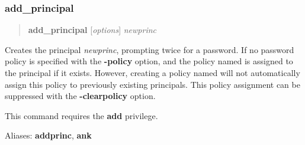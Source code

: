 \documentclass[letterpaper,10pt,english]{sphinxmanual}
\begin{document}
\subsubsection{add\_principal}
\label{admin/admin_commands/kadmin_local:add-principal}\label{admin/admin_commands/kadmin_local:id1}\begin{quote}

\textbf{add\_principal} {[}\emph{options}{]} \emph{newprinc}
\end{quote}

Creates the principal \emph{newprinc}, prompting twice for a password.  If
no password policy is specified with the \textbf{-policy} option, and the
policy named  is assigned to the principal if it exists.
However, creating a policy named  will not automatically
assign this policy to previously existing principals.  This policy
assignment can be suppressed with the \textbf{-clearpolicy} option.

This command requires the \textbf{add} privilege.

Aliases: \textbf{addprinc}, \textbf{ank}
\end{document}
